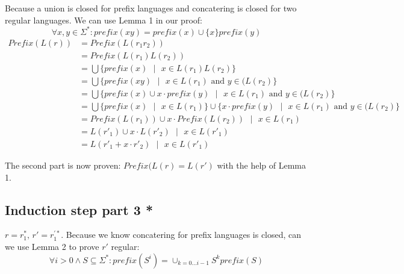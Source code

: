 \documentclass{article}
\begin{document}
    Because a union is closed for prefix languages and concatering is closed for two regular languages. We can use Lemma 1 in our proof:\\
        $$ \forall x,y\in\Sigma^*: prefix(xy) = prefix(x) \cup \{x\}prefix(y)$$
    \begin{equation*}
        \begin{split}
        Prefix(L(r)) &= Prefix(L(r_1r_2)) \\
            &= Prefix(L(r_1)L(r_2)) \\
            &= \bigcup \{prefix(x) \text{ } | \text{ } x \in L(r_1)L(r_2)\} \\
            &= \bigcup \{prefix(xy) \text{ } | \text{ } x \in L(r_1) \text{ and } y \in (L(r_2)\} \\
            &= \bigcup \{prefix(x) \cup x \cdot prefix(y) \text{ } | \text{ } x \in L(r_1) \text{ and } y \in (L(r_2)\} \\
            &= \bigcup \{prefix(x) \text{ } | \text{ } x \in L(r_1) \} \cup \{x \cdot prefix(y) \text{ } | \text{ } x \in L(r_1) \text{ and } y \in (L(r_2)\} \\
            &= Prefix(L(r_1)) \cup x \cdot Prefix(L(r_2)) \text{ } | \text{ } x \in L(r_1) \\
            &= L(r'_1) \cup x \cdot L(r'_2) \text{ } | \text{ } x \in L(r'_1) \\
            &= L(r'_1 + x \cdot r'_2) \text{ } | \text{ } x \in L(r'_1) 
        \end{split}
    \end{equation*}
    
    The second part is now proven: $ Prefix(L(r)=L(r') $ with the help of Lemma 1.


\subsection*{Induction step part 3 *}
$ r=r_{1}^{*} \text{, } r'=r_{1}^{'*}  $. 
    Because we know concatering for prefix languages is closed, can we use Lemma 2 to prove $ r{'} $ regular:
        $$\forall i>0 \wedge S \subseteq \Sigma^*: prefix(S^i) = \cup_{k = 0...i-1} S^kprefix(S)$$
       
\end{document}
